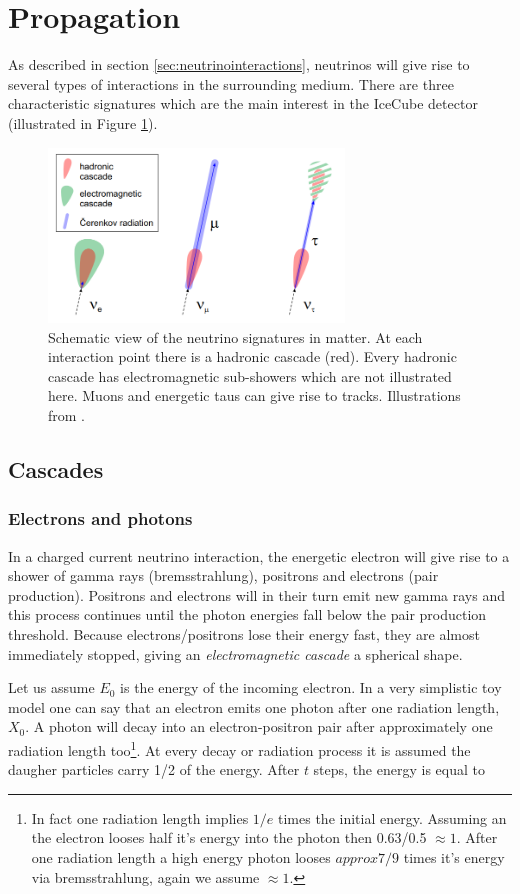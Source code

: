 \section{Propagation}
\label{sec:propagation}
As described in section \ref{sec:neutrinointeractions}, neutrinos will give rise to several types of interactions in the surrounding medium. There are three characteristic signatures which are the main interest in the IceCube detector (illustrated in Figure \ref{fig:ICinteractions}).

\begin{figure}[t]
\centering
\includegraphics[width=0.7\textwidth]{chapter4/img/ICinteractions.png}
\caption{Schematic view of the neutrino signatures in matter. At each interaction point there is a hadronic cascade (red). Every hadronic cascade has electromagnetic sub-showers which are not illustrated here. Muons and energetic taus can give rise to tracks. Illustrations from \cite{Wallraff}.}
\label{fig:ICinteractions}
\end{figure}

\subsection{Cascades}
\subsubsection{Electrons and photons}

In a charged current neutrino interaction, the energetic electron will give rise to a shower of gamma rays (bremsstrahlung), positrons and electrons (pair production). Positrons and electrons will in their turn emit new gamma rays and this process continues until the photon energies fall below the pair production threshold. Because electrons/positrons lose their energy fast, they are almost immediately stopped, giving an \textit{electromagnetic cascade} a spherical shape.

Let us assume $E_0$ is the energy of the incoming electron. In a very simplistic toy model one can say that an electron emits one photon after one radiation length, $X_0$. A photon will decay into an electron-positron pair after approximately one radiation length too\footnote{In fact one radiation length implies $1/e$ times the initial energy. Assuming an the electron looses half it's energy into the photon then 0.63/0.5 $\approx 1$. After one radiation length a high energy photon looses $approx 7/9$ times it's energy via bremsstrahlung, again we assume $\approx 1$.}. At every decay or radiation process it is assumed the daugher particles carry 1/2 of the energy. After $t$ steps, the energy is equal to

